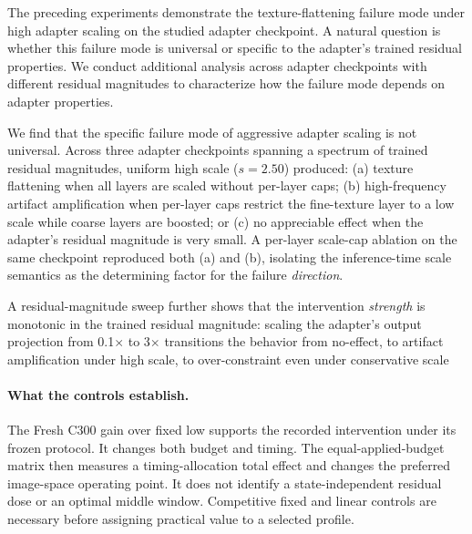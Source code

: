 \documentclass[times,twocolumn,final]{elsarticle}
\providecommand{\DIFadd}[1]{{\protect\color{blue} \sf #1}} %
\providecommand{\DIFdel}[1]{{\protect\color{red} \scriptsize #1}} %
\providecommand{\DIFaddbegin}{} %
\providecommand{\DIFaddend}{} %
\providecommand{\DIFdelbegin}{} %
\providecommand{\DIFdelend}{} %
\begin{document}
\DIFdelbegin %

\DIFdel{The preceding experiments demonstrate the texture-flattening failure mode under high adapter scaling on the studied adapter checkpoint. A natural question is whether this failure mode is universal or specific to the adapter's trained residual properties. We conduct additional analysis across adapter checkpoints with different residual magnitudes to characterize how the failure mode depends on adapter properties. }%

\DIFdel{We find that the specific failure mode of aggressive adapter scaling is not universal. Across three adapter checkpoints spanning a spectrum of trained residual magnitudes, uniform high scale ($s = 2.50$) produced: (a) texture flattening when all layers are scaled without per-layer caps; (b) high-frequency artifact amplification when per-layer caps restrict the fine-texture layer to a low scale while coarse layers are boosted; or (c) no appreciable effect when the adapter's residual magnitude is very small. A per-layer scale-cap ablation on the same checkpoint reproduced both (a) and (b), isolating the inference-time scale semantics as the determining factor for the failure \emph{direction}.
}%

\DIFdel{A residual-magnitude sweep further shows that the intervention \emph{strength} is monotonic in the trained residual magnitude: scaling the adapter's output projection from 0.1$\times$ to 3$\times$ transitions the behavior from no-effect, to artifact amplification under high scale, to over-constraint even under conservative scale}\DIFdelend \DIFaddbegin \paragraph{What the controls establish.}
\DIFadd{The Fresh C300 gain over fixed low supports the recorded intervention under its frozen protocol}\DIFaddend . \DIFaddbegin \DIFadd{It changes both budget and timing. The equal-applied-budget matrix then measures a timing-allocation total effect and changes the preferred image-space operating point. It does not identify a state-independent residual dose or an optimal middle window. Competitive fixed and linear controls are necessary before assigning practical value to a selected profile.
}\DIFaddend 
\end{document}
